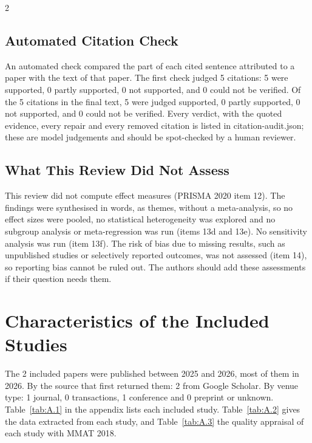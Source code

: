 \documentclass[10pt,a4paper]{article}
\begin{document}
\begin{multicols}{2}
\subsection{Automated Citation Check}\label{sec:automated-citation-check}

An automated check compared the part of each cited sentence attributed to a paper with the text of that paper.
The first check judged 5 citations: 5 were supported, 0 partly supported, 0 not supported, and 0 could not be verified.
Of the 5 citations in the final text, 5 were judged supported, 0 partly supported, 0 not supported, and 0 could not be verified.
Every verdict, with the quoted evidence, every repair and every removed citation is listed in citation-audit.\allowbreak{}json; these are model judgements and should be spot-checked by a human reviewer.

\subsection{What This Review Did Not Assess}\label{sec:what-this-review-did-not-assess}

This review did not compute effect measures (PRISMA 2020 item 12).
The findings were synthesised in words, as themes, without a meta-analysis, so no effect sizes were pooled, no statistical heterogeneity was explored and no subgroup analysis or meta-regression was run (items 13d and 13e).
No sensitivity analysis was run (item 13f).
The risk of bias due to missing results, such as unpublished studies or selectively reported outcomes, was not assessed (item 14), so reporting bias cannot be ruled out.
The authors should add these assessments if their question needs them.

\end{multicols}

\section{Characteristics of the Included Studies}\label{sec:characteristics-of-the-included-studies}

The 2 included papers were published between 2025 and 2026, most of them in 2026.
By the source that first returned them: 2 from Google Scholar.
By venue type: 1 journal, 0 transactions, 1 conference and 0 preprint or unknown.
Table~\ref{tab:A.1} in the appendix lists each included study.
Table~\ref{tab:A.2} gives the data extracted from each study, and Table~\ref{tab:A.3} the quality appraisal of each study with MMAT 2018.
\end{document}
